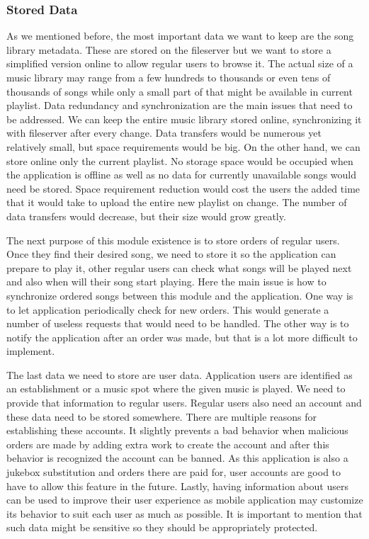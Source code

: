 \subsubsection{Stored Data}

As we mentioned before, the most important data we want to keep are the song library metadata. These are stored on the fileserver but we want to store a simplified version online to allow regular users to browse it. The actual size of a music library may range from a few hundreds to thousands or even tens of thousands of songs while only a small part of that might be available in current playlist. Data redundancy and synchronization are the main issues that need to be addressed. We can keep the entire music library stored online, synchronizing it with fileserver after every change. Data transfers would be numerous yet relatively small, but space requirements would be big. On the other hand, we can store online only the current playlist. No storage space would be occupied when the application is offline as well as no data for currently unavailable songs would need be stored. Space requirement reduction would cost the users the added time that it would take to upload the entire new playlist on change. The number of data transfers would decrease, but their size would grow greatly.
\par
The next purpose of this module existence is to store orders of regular users. Once they find their desired song, we need to store it so the application can prepare to play it, other regular users can check what songs will be played next and also when will their song start playing. Here the main issue is how to synchronize ordered songs between this module and the application. One way is to let application periodically check for new orders. This would generate a number of useless requests that would need to be handled. The other way is to notify the application after an order was made, but that is a lot more difficult to implement.
\par
The last data we need to store are user data. Application users are identified as an establishment or a music spot where the given music is played. We need to provide that information to regular users. Regular users also need an account and these data need to be stored somewhere. There are multiple reasons for establishing these accounts. It slightly prevents a bad behavior when malicious orders are made by adding extra work to create the account and after this behavior is recognized the account can be banned. As this application is also a jukebox substitution and orders there are paid for, user accounts are good to have to allow this feature in the future. Lastly, having information about users can be used to improve their user experience as mobile application may customize its behavior to suit each user as much as possible. It is important to mention that such data might be sensitive so they should be appropriately protected.

